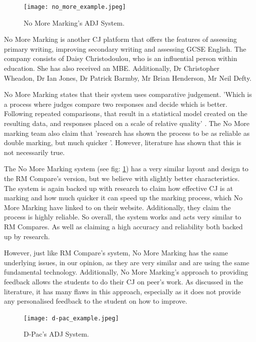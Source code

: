 		\begin{figure}[t]
			\centering
			\texttt{[image: no\_more\_example.jpeg]}
			\caption{No More Marking's ADJ System.}
			\label{fig:no_more_ex}
			
		\end{figure}
		
		No More Marking is another CJ platform that offers the features of assessing primary writing, improving secondary writing and assessing GCSE English. The company consists of Daisy Christodoulou, who is an influential person within education. She has also received an MBE. Additionally, Dr Christopher Wheadon, Dr Ian Jones, Dr Patrick Barmby, Mr Brian Henderson, Mr Neil Defty.

		No More Marking states that their system uses comparative judgement. 'Which is a process where judges compare two responses and decide which is better. Following repeated comparisons, that result in a statistical model created on the resulting data, and responses placed on a scale of relative quality' \cite{nmm_website}. The No More marking team also claim that 'research has shown the process to be as reliable as double marking, but much quicker \cite{nmm_website}'. However, literature has shown that this is not necessarily true.		
		
		The No More Marking system (see fig: \ref{fig:no_more_ex}) has a very similar layout and design to the RM Compare's version, but we believe with slightly better characteristics. The system is again backed up with research to claim how effective CJ is at marking and how much quicker it can speed up the marking process, which No More Marking have linked to on their website. Additionally, they claim the process is highly reliable. So overall, the system works and acts very similar to RM Compares. As well as claiming a high accuracy and reliability both backed up by research.
		
		However, just like RM Compare's system, No More Marking has the same underlying issues, in our opinion, as they are very similar and are using the same fundamental technology. Additionally, No More Marking's approach to providing feedback allows the students to do their CJ on peer's work. As discussed in the literature, it has many flaws in this approach, especially as it does not provide any personalised feedback to the student on how to improve.  
	
	
		\begin{figure}[t]
			\centering
			\texttt{[image: d-pac\_example.jpeg]}
			\caption{D-Pac's ADJ System.}
			\label{fig:d-pac_ex}
			
		\end{figure}
	
